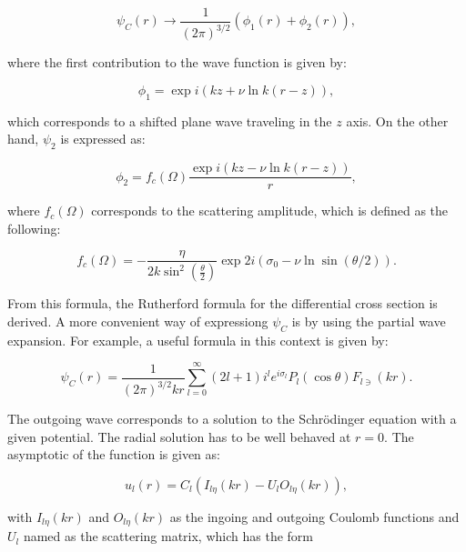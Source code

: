 \documentclass[openany]{book}
\begin{document}
\begin{equation}\label{rmatrix_coulombPsi_asymptotics}
	\psi_C(r) \rightarrow \frac{1}{(2\pi)^{3/2}} \left(\phi_1(r) + \phi_2(r)\right),
\end{equation}

where the first contribution to the wave function is given by:

\begin{equation}\label{rmatrix_coulombPsi_asymptotics_1}
	\phi_1 = \exp {i (kz + \nu 	\ln {k(r-z)}) },
\end{equation}

which corresponds to a shifted plane wave traveling in the $z$ axis. On the other hand, $\psi_2$ is expressed as: 

\begin{equation}\label{rmatrix_coulombPsi_asymptotics_2}
	\phi_2 = f_c(\Omega) \frac{\exp {i (kz - \nu 	\ln {k(r-z)}) }}{r},
\end{equation}

where $f_c(\Omega)$ corresponds to the scattering amplitude, which is defined as the following: 

\begin{equation}\label{rmatrix_coulombPsi_scatteringAmplitude}
	f_c(\Omega) = - \frac{\eta}{2k\sin^2 \left(\frac{\theta}{2}\right)} \exp{ 2i \left(\sigma_0 - \nu \ln \sin (\theta /2)\right)}.
\end{equation}

From this formula, the Rutherford formula for the differential cross section is derived. A more convenient way of expressiong $\psi_C$ is by using the partial wave expansion. For example, a useful formula in this context is given by: 

 \begin{equation}\label{rmatrix_coulombPsi_partialWaves}
	\psi_C(r) = \frac{1}{(2\pi)^{3/2}kr} \sum_{l=0}^{\infty} { (2l + 1) i^l e^{i\sigma_l} P_l(\cos \theta) F_{l\ni} (kr)}.
 \end{equation}

The outgoing wave corresponds to a solution to the Schrödinger equation with a given potential. The radial solution has to be well behaved at $r = 0$. The asymptotic of the function is given as: 

 \begin{equation}\label{rmatrix_coulombPsi_u_asymptotics}
	u_l(r) = C_l (I_{l\eta}(kr) - U_lO_{l\eta}(kr)),
\end{equation}

with $I_{l\eta}(kr)$ and $O_{l\eta}(kr)$ as the ingoing and outgoing Coulomb functions and $U_l$ named as the scattering matrix, which has the form 
\end{document}
